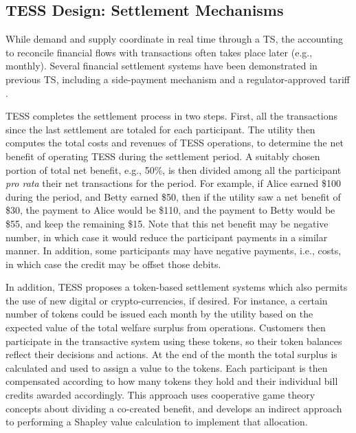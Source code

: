 \subsection{TESS Design: Settlement Mechanisms}\label{sec:settlement}

While demand and supply coordinate in real time through a TS, the accounting to reconcile financial flows with transactions often takes place later (e.g., monthly). Several financial settlement systems have been demonstrated in previous TS, including a side-payment mechanism \citep{hammerstrom_2008} and a regulator-approved tariff \citep{Widergren2014}. 

TESS completes the settlement process in two steps. First, all the transactions since the last settlement are totaled for each participant. The utility then computes the total costs and revenues of TESS operations, to determine the net benefit of operating TESS during the settlement period.  A suitably chosen portion of total net benefit, e.g., 50\%, is then divided among all the participant \textit{pro rata} their net transactions for the period.  For example, if Alice earned \$100 during the period, and Betty earned \$50, then if the utility saw a net benefit of \$30, the payment to Alice would be \$110, and the payment to Betty would be \$55, and keep the remaining \$15. Note that this net benefit may be negative number, in which case it would reduce the participant payments in a similar manner. In addition, some participants may have negative payments, i.e., costs, in which case the credit may be offset those debits. 

In addition, TESS proposes a token-based settlement systems which also permits the use of new digital or crypto-currencies, if desired.
For instance, a certain number of tokens could be issued each month by the utility based on the expected value of the total welfare surplus from operations. Customers then participate in the transactive system using these tokens, so their token balances reflect their decisions and actions. At the end of the month the total surplus is calculated and used to assign a value to the tokens. Each participant is then compensated according to how many tokens they hold and their individual bill credits awarded accordingly. This approach uses cooperative game theory concepts about dividing a co-created benefit, and develops an indirect approach to performing a Shapley value calculation to implement that allocation.

